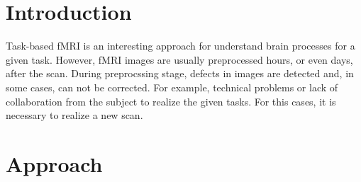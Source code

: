 \documentclass[twocolumn]{bmcart}%
\begin{document}
\begin{frontmatter}
\begin{fmbox}

	








%
\end{fmbox}%

\end{frontmatter}


\section{Introduction}\label{introduction}

Task-based fMRI is an interesting approach for understand brain
processes for a given task. However, fMRI images are usually
preprocessed hours, or even days, after the scan. During preprocssing
stage, defects in images are detected and, in some cases, can not be
corrected. For example, technical problems or lack of collaboration from
the subject to realize the given tasks. For this cases, it is necessary
to realize a new scan.

\section{Approach}\label{approach}
\end{document}
